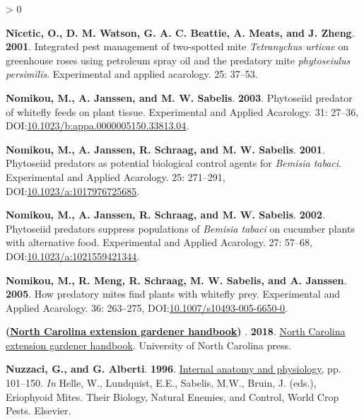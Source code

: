 \documentclass{ufdissertation}[overrideChapters] %
\newlength{\cslhangindent}
\newenvironment{CSLReferences}[2] %
 {%
  \setlength{\parindent}{0pt}
  \ifodd #1 \everypar{\setlength{\hangindent}{\cslhangindent}}\ignorespaces\fi
  \ifnum #2 > 0
  \setlength{\parskip}{#2\baselineskip}
  \fi
 }%
 {}
\begin{document}
{\begin{CSLReferences}{1}{1}
\leavevmode{}%
\textbf{Nicetic, O., D. M. Watson, G. A. C. Beattie, A. Meats, and J. Zheng}. \textbf{2001}. Integrated pest management of two-spotted mite {\emph{Tetranychus urticae}} on greenhouse roses using petroleum spray oil and the predatory mite \emph{phytoseiulus persimilis}. Experimental and applied acarology. 25: 37--53.

\leavevmode{}%
\textbf{Nomikou, M., A. Janssen, and M. W. Sabelis}. \textbf{2003}. Phytoseiid predator of whitefly feeds on plant tissue. Experimental and Applied Acarology. 31: 27--36, DOI:\href{https://doi.org/10.1023/b:appa.0000005150.33813.04}{10.1023/b:appa.0000005150.33813.04}.

\leavevmode{}%
\textbf{Nomikou, M., A. Janssen, R. Schraag, and M. W. Sabelis}. \textbf{2001}. Phytoseiid predators as potential biological control agents for {\emph{Bemisia tabaci}}. Experimental and Applied Acarology. 25: 271--291, DOI:\href{https://doi.org/10.1023/a:1017976725685}{10.1023/a:1017976725685}.

\leavevmode{}%
\textbf{Nomikou, M., A. Janssen, R. Schraag, and M. W. Sabelis}. \textbf{2002}. Phytoseiid predators suppress populations of {\emph{Bemisia tabaci}} on cucumber plants with alternative food. Experimental and Applied Acarology. 27: 57--68, DOI:\href{https://doi.org/10.1023/a:1021559421344}{10.1023/a:1021559421344}.

\leavevmode{}%
\textbf{Nomikou, M., R. Meng, R. Schraag, M. W. Sabelis, and A. Janssen}. \textbf{2005}. How predatory mites find plants with whitefly prey. Experimental and Applied Acarology. 36: 263--275, DOI:\href{https://doi.org/10.1007/s10493-005-6650-0}{10.1007/s10493-005-6650-0}.

\leavevmode{}%
\textbf{(\href{https://www.ebook.de/de/product/32731736/north_carolina_extension_gardener_handbook.html}{{North Carolina} extension gardener handbook}) }. \textbf{2018}. \href{https://www.ebook.de/de/product/32731736/north_carolina_extension_gardener_handbook.html}{{North Carolina} extension gardener handbook}. University of {North Carolina} press.

\leavevmode{}%
\textbf{Nuzzaci, G., and G. Alberti}. \textbf{1996}. \href{https://doi.org/10.1016/s1572-4379(96)80006-6}{Internal anatomy and physiology}, pp. 101--150. \emph{In} Helle, W., Lundquist, E.E., Sabelis, M.W., Bruin, J. (eds.), Eriophyoid Mites. Their Biology, Natural Enemies, and Control, World Crop Pests. Elsevier.


\end{CSLReferences}}
\end{document}
